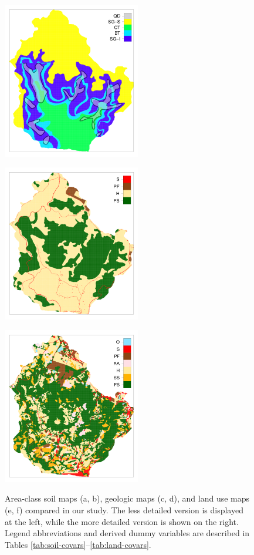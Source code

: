\begin{figure}[!ht]
\begin{minipage}[b]{63mm}
    \end{minipage}
    \begin{minipage}[b]{63mm}
       \label{fig:geo-new}
       \centering
       \includegraphics[width=60mm]{chap01FIG3e}
    \end{minipage}
    \begin{minipage}[b]{63mm}
       \label{fig:land-old}
       \centering
       \includegraphics[width=60mm]{chap01FIG3c}
    \end{minipage}
    \begin{minipage}[b]{63mm}
       \label{fig:land-new}
       \centering
       \includegraphics[width=60mm]{chap01FIG3f}
    \end{minipage}
   \caption{Area-class soil maps (a, b), geologic maps (c, d), and land use 
   maps (e, f) compared in our study. The less detailed version is displayed 
   at the left, while the more detailed version is shown on the right. Legend 
   abbreviations and derived dummy variables are described in Tables 
   \ref{tab:soil-covars}--\ref{tab:land-covars}.}
  \label{fig:cat-covars}
\end{figure}


